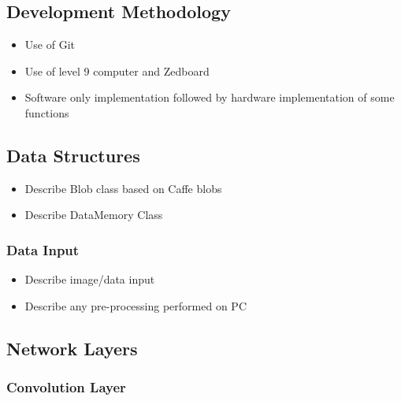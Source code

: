 \documentclass[12pt]{article}
\begin{document}
\subsection{Development Methodology}
\label{sec:Imp-Devlopment}
\vspace{-12pt}

\begin{itemize}
\item Use of Git
\item Use of level 9 computer and Zedboard
\item Software only implementation followed by hardware implementation of some functions
\end{itemize}

\subsection{Data Structures}
\label{sec:Imp-blobs}
\vspace{-12pt}

\begin{itemize}
\item Describe Blob class based on Caffe blobs
\item Describe DataMemory Class
\end{itemize}

\subsubsection{Data Input}
\label{sec:Imp-Input}
\vspace{-12pt}

\begin{itemize}
\item Describe image/data input
\item Describe any pre-processing performed on PC
\end{itemize}

\subsection{Network Layers}
\label{sec:Imp-Layers}
\vspace{-12pt} 

\subsubsection{Convolution Layer}
\label{sec:Imp-Layers-Conv}
\vspace{-12pt}
\end{document}
